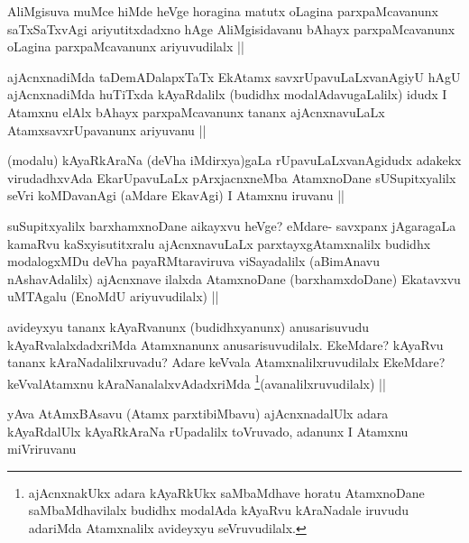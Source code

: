 \begin{artha}
AliMgisuva muMce hiMde heVge horagina matutx oLagina parxpaMcavanunx saTxSaTxvAgi ariyutitxdadxno hAge AliMgisidavanu bAhayx parxpaMcavanunx oLagina parxpaMcavanunx ariyuvudilalx ||
\end{artha}

\begin{artha}
ajAcnxnadiMda taDemADalapxTaTx EkAtamx savxrUpavuLaLxvanAgiyU hAgU ajAcnxnadiMda huTiTxda kAyaRdalilx (budidhx modalAdavugaLalilx) idudx I Atamxnu elAlx bAhayx parxpaMcavanunx tananx ajAcnxnavuLaLx AtamxsavxrUpavanunx ariyuvanu ||
\end{artha}

\begin{artha}
(modalu) kAyaRkAraNa (deVha iMdirxya)gaLa rUpavuLaLxvanAgidudx adakekx virudadhxvAda EkarUpavuLaLx pArxjacnxneMba AtamxnoDane sUSupitxyalilx seVri koMDavanAgi (aMdare EkavAgi) I Atamxnu iruvanu ||
\end{artha}

\begin{artha}
suSupitxyalilx barxhamxnoDane aikayxvu heVge? eMdare- savxpanx jAgaragaLa kamaRvu kaSxyisutitxralu ajAcnxnavuLaLx parxtayxgAtamxnalilx budidhx modalogxMDu deVha payaRMtaraviruva viSayadalilx (aBimAnavu nAshavAdalilx) ajAcnxnave ilalxda AtamxnoDane (barxhamxdoDane) Ekatavxvu uMTAgalu (EnoMdU ariyuvudilalx) ||
\end{artha}


\begin{artha}
avideyxyu tananx kAyaRvanunx (budidhxyanunx) anusarisuvudu kAyaRvalalxdadxriMda Atamxnanunx anusarisuvudilalx. EkeMdare? kAyaRvu tananx kAraNadalilxruvadu? Adare keVvala Atamxnalilxruvudilalx EkeMdare? keVvalAtamxnu kAraNanalalxvAdadxriMda \footnote{ajAcnxnakUkx adara kAyaRkUkx saMbaMdhave horatu AtamxnoDane saMbaMdhavilalx budidhx modalAda kAyaRvu kAraNadale iruvudu adariMda Atamxnalilx avideyxyu seVruvudilalx.}(avanalilxruvudilalx) ||
\end{artha}


\begin{artha}
yAva AtAmxBAsavu (Atamx parxtibiMbavu) ajAcnxnadalUlx adara kAyaRdalUlx kAyaRkAraNa rUpadalilx toVruvado, adanunx I Atamxnu miVriruvanu
\end{artha}

